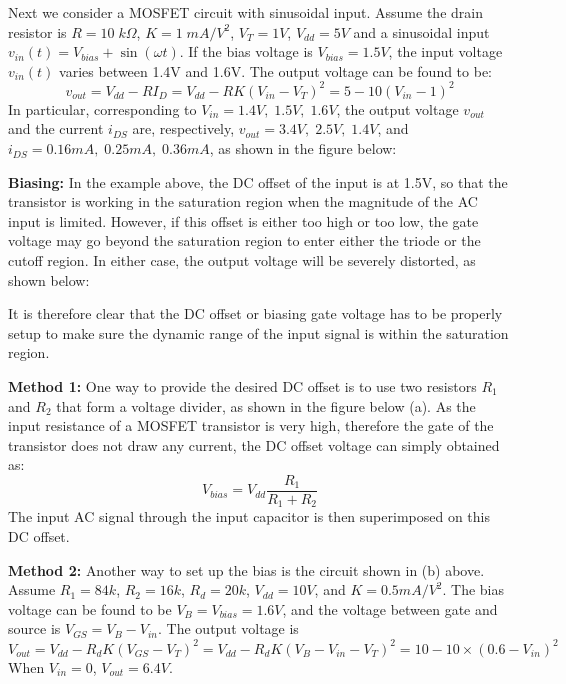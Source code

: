 \documentclass{article}
\begin{document}
Next we consider a MOSFET circuit with sinusoidal input. Assume the drain resistor
is $R=10\;k\Omega$, $K=1\;mA/V^2$, $V_T=1V$, $V_{dd}=5V$ and a sinusoidal input 
$v_{in}(t)=V_{bias}+\sin(\omega t)$. If the bias voltage is $V_{bias}=1.5V$, the
input voltage $v_{in}(t)$ varies between 1.4V and 1.6V. The output voltage can be
found to be:
\begin{equation} v_{out}=V_{dd}-RI_D=V_{dd}-RK(V_{in}-V_T)^2=5-10 (V_{in}-1)^2 \end{equation}
In particular, corresponding to $V_{in}=1.4V,\;1.5V,\;1.6V$, the output voltage 
$v_{out}$ and the current $i_{DS}$ are, respectively, $v_{out}=3.4V,\;2.5V,\;1.4V$, 
and $i_{DS}=0.16mA,\;0.25mA,\;0.36mA$, as shown in the figure below:


{\bf Biasing:} In the example above, the DC offset of the input is at 1.5V, so that
the transistor is working in the saturation region when the magnitude of the AC input
is limited. However, if this offset is either too high or too low, the gate voltage
may go beyond the saturation region to enter either the triode or the cutoff region.
In either case, the output voltage will be severely distorted, as shown below:


It is therefore clear that the DC offset or biasing gate voltage has to be properly
setup to make sure the dynamic range of the input signal is within the saturation 
region. 

{\bf Method 1:} One way to provide the desired DC offset is to use two resistors 
$R_1$ and $R_2$ that form a voltage divider, as shown in the figure below (a). As 
the input resistance of a MOSFET transistor is very high, therefore the gate of 
the transistor does not draw any current, the DC offset voltage can simply obtained
as:
\begin{equation} V_{bias}=V_{dd}\frac{R_1}{R_1+R_2} \end{equation}
The input AC signal through the input capacitor is then superimposed on this DC 
offset. 


{\bf Method 2: } Another way to set up the bias is the circuit shown in (b) above.
Assume $R_1=84k$, $R_2=16k$, $R_d=20k$, $V_{dd}=10V$, and $K=0.5mA/V^2$.  The bias 
voltage can be found to be $V_B=V_{bias}=1.6V$, and the voltage between gate and 
source is $V_{GS}=V_B-V_{in}$. The output voltage is
\begin{equation} V_{out}=V_{dd}-R_d K (V_{GS}-V_T)^2=V_{dd}-R_d K (V_B-V_{in}-V_T)^2=10-10\times 
(0.6-V_{in})^2  \end{equation}
When $V_{in}=0$, $V_{out}=6.4V$.
\end{document}
